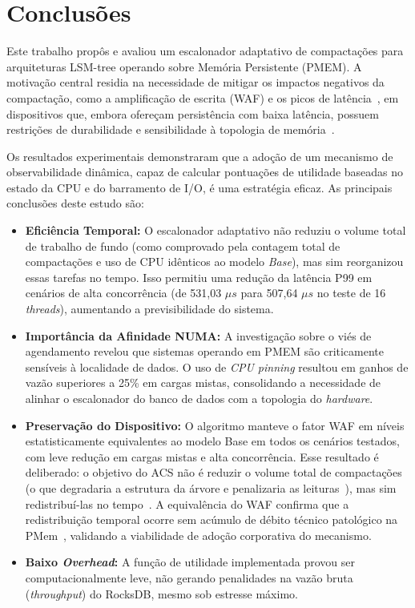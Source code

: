 \section*{Conclusões}

Este trabalho propôs e avaliou um escalonador adaptativo de compactações para arquiteturas LSM-tree operando sobre Memória Persistente (PMEM). A motivação central residia na necessidade de mitigar os impactos negativos da compactação,  como a amplificação de escrita (WAF) e os picos de latência~\cite{revisting_design_lsm}, em dispositivos que, embora ofereçam persistência com baixa latência, possuem restrições de durabilidade e sensibilidade à topologia de memória~\cite{van_renen_2020}.

Os resultados experimentais demonstraram que a adoção de um mecanismo de observabilidade dinâmica, capaz de calcular pontuações de utilidade baseadas no estado da CPU e do barramento de I/O, é uma estratégia eficaz. As principais conclusões deste estudo são:

\begin{itemize}
    \item \textbf{Eficiência Temporal:} O escalonador adaptativo não reduziu o volume total de trabalho de fundo (como comprovado pela contagem total de compactações e uso de CPU idênticos ao modelo \textit{Base}), mas sim reorganizou essas tarefas no tempo. Isso permitiu uma redução da latência P99 em cenários de alta concorrência (de 531,03 $\mu s$ para 507,64 $\mu s$ no teste de 16 \textit{threads}), aumentando a previsibilidade do sistema.
    \item \textbf{Importância da Afinidade NUMA:} A investigação sobre o viés de agendamento revelou que sistemas operando em PMEM são criticamente sensíveis à localidade de dados. O uso de \textit{CPU pinning} resultou em ganhos de vazão superiores a 25\% em cargas mistas, consolidando a necessidade de alinhar o escalonador do banco de dados com a topologia do \textit{hardware}.
    \item \textbf{Preservação do Dispositivo:} O algoritmo manteve o fator WAF em
    níveis estatisticamente equivalentes ao modelo Base em todos os cenários testados, com leve redução em cargas mistas e alta concorrência. Esse resultado é deliberado: o objetivo do ACS não é reduzir o volume
    total de compactações (o que degradaria a estrutura da árvore e penalizaria as
    leituras~\cite{Sarkar_2021}), mas sim redistribuí-las no tempo~\cite{dCompaction}.
    A equivalência do WAF confirma que a redistribuição temporal ocorre sem acúmulo de
    débito técnico patológico na PMem~\cite{van_renen_2020,revisting_design_lsm},
    validando a viabilidade de adoção corporativa do mecanismo. 
    \item \textbf{Baixo \textit{Overhead}:} A função de utilidade implementada provou ser computacionalmente leve, não gerando penalidades na vazão bruta (\textit{throughput}) do RocksDB, mesmo sob estresse máximo.
\end{itemize}

